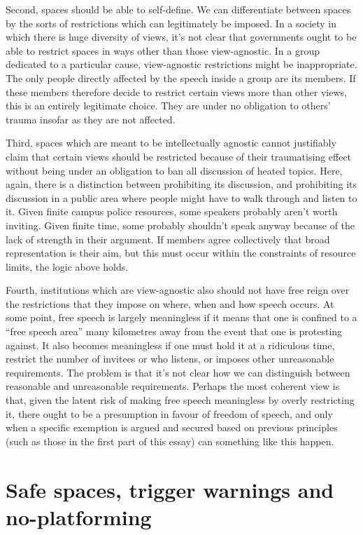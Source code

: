 \documentclass[10pt,a4paper,twoside]{article}
\begin{document}
\begin{multicols}{2}
Second, spaces should be able to self-define. We can differentiate
between spaces by the sorts of restrictions which can legitimately be
imposed. In a society in which there is huge diversity of views, it's
not clear that governments ought to be able to restrict spaces in ways
other than those view-agnostic. In a group dedicated to a particular
cause, view-agnostic restrictions might be inappropriate. The only
people directly affected by the speech inside a group are its members.
If these members therefore decide to restrict certain views more than
other views, this is an entirely legitimate choice. They are under no
obligation to others' trauma insofar as they are not affected.

Third, spaces which are meant to be intellectually agnostic cannot
justifiably claim that certain views should be restricted because of
their traumatising effect without being under an obligation to ban all
discussion of heated topics. Here, again, there is a distinction between
prohibiting its discussion, and prohibiting its discussion in a public
area where people might have to walk through and listen to it. Given
finite campus police resources, some speakers probably aren't worth
inviting. Given finite time, some probably shouldn't speak anyway
because of the lack of strength in their argument. If members agree
collectively that broad representation is their aim, but this must occur
within the constraints of resource limits, the logic above holds.

Fourth, institutions which are view-agnostic also should not have free
reign over the restrictions that they impose on where, when and how
speech occurs. At some point, free speech is largely meaningless if it
means that one is confined to a ``free speech area'' many kilometres
away from the event that one is protesting against. It also becomes
meaningless if one must hold it at a ridiculous time, restrict the
number of invitees or who listens, or imposes other unreasonable
requirements. The problem is that it's not clear how we can distinguish
between reasonable and unreasonable requirements. Perhaps the most
coherent view is that, given the latent risk of making free speech
meaningless by overly restricting it, there ought to be a presumption in
favour of freedom of speech, and only when a specific exemption is
argued and secured based on previous principles (such as those in the
first part of this essay) can something like this happen.

\section{Safe spaces, trigger warnings and
	no-platforming}\label{safe-spaces-trigger-warnings-and-no-platforming}


\end{multicols}
\end{document}
